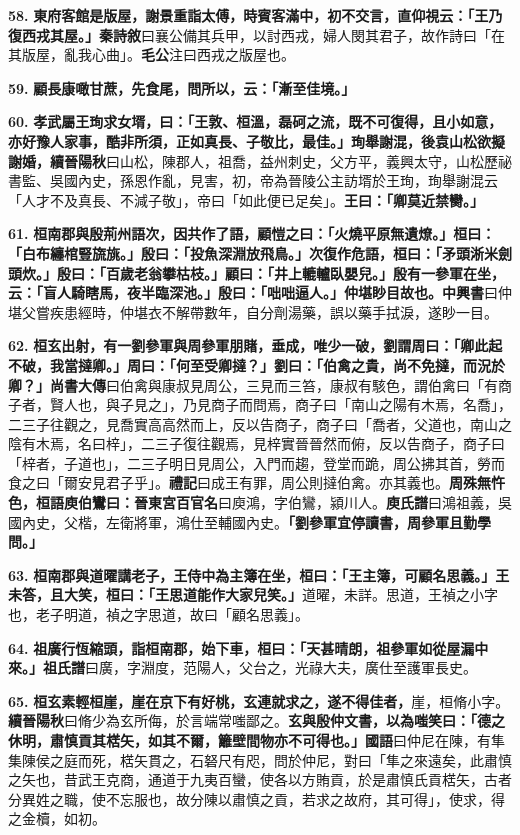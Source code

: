 \textbf{58.} \textbf{東府客館是版屋，謝景重詣太傅，時賓客滿中，初不交言，直仰視云：「王乃復西戎其屋。」}{\footnotesize \textbf{秦詩敘}曰襄公備其兵甲，以討西戎，婦人閔其君子，故作詩曰「在其版屋，亂我心曲」。\textbf{毛公}注曰西戎之版屋也。}

\textbf{59.} \textbf{顧長康噉甘蔗，先食尾，問所以，云：「漸至佳境。」}

\textbf{60.} \textbf{孝武屬王珣求女壻，曰：「王敦、桓溫，磊砢之流，既不可復得，且小如意，亦好豫人家事，酷非所須，正如真長、子敬比，最佳。」珣舉謝混，後袁山松欲擬謝婚，}{\footnotesize \textbf{續晉陽秋}曰山松，陳郡人，祖喬，益州刺史，父方平，義興太守，山松歷祕書監、吳國內史，孫恩作亂，見害，初，帝為晉陵公主訪壻於王珣，珣舉謝混云「人才不及真長、不減子敬」，帝曰「如此便已足矣」。}\textbf{王曰：「卿莫近禁臠。」}

\textbf{61.} \textbf{桓南郡與殷荊州語次，因共作了語，顧愷之曰：「火燒平原無遺燎。」桓曰：「白布纏棺豎旒旐。」殷曰：「投魚深淵放飛鳥。」次復作危語，桓曰：「矛頭淅米劍頭炊。」殷曰：「百歲老翁攀枯枝。」顧曰：「井上轆轤臥嬰兒。」殷有一參軍在坐，云：「盲人騎瞎馬，夜半臨深池。」殷曰：「咄咄逼人。」仲堪眇目故也。}{\footnotesize \textbf{中興書}曰仲堪父嘗疾患經時，仲堪衣不解帶數年，自分劑湯藥，誤以藥手拭淚，遂眇一目。}

\textbf{62.} \textbf{桓玄出射，有一劉參軍與周參軍朋賭，垂成，唯少一破，劉謂周曰：「卿此起不破，我當撻卿。」周曰：「何至受卿撻？」劉曰：「伯禽之貴，尚不免撻，而況於卿？」}{\footnotesize \textbf{尚書大傳}曰伯禽與康叔見周公，三見而三笞，康叔有駭色，謂伯禽曰「有商子者，賢人也，與子見之」，乃見商子而問焉，商子曰「南山之陽有木焉，名喬」，二三子往觀之，見喬實高高然而上，反以告商子，商子曰「喬者，父道也，南山之陰有木焉，名曰梓」，二三子復往觀焉，見梓實晉晉然而俯，反以告商子，商子曰「梓者，子道也」，二三子明日見周公，入門而趨，登堂而跪，周公拂其首，勞而食之曰「爾安見君子乎」。\textbf{禮記}曰成王有罪，周公則撻伯禽。亦其義也。}\textbf{周殊無忤色，桓語庾伯鸞曰：}{\footnotesize \textbf{晉東宮百官名}曰庾鴻，字伯鸞，潁川人。\textbf{庾氏譜}曰鴻祖義，吳國內史，父楷，左衛將軍，鴻仕至輔國內史。}\textbf{「劉參軍宜停讀書，周參軍且勤學問。」}

\textbf{63.} \textbf{桓南郡與道曜講老子，王侍中為主簿在坐，桓曰：「王主簿，可顧名思義。」王未答，且大笑，桓曰：「王思道能作大家兒笑。」}{\footnotesize 道曜，未詳。思道，王禎之小字也，老子明道，禎之字思道，故曰「顧名思義」。}

\textbf{64.} \textbf{祖廣行恆縮頭，詣桓南郡，始下車，桓曰：「天甚晴朗，祖參軍如從屋漏中來。」}{\footnotesize \textbf{祖氏譜}曰廣，字淵度，范陽人，父台之，光祿大夫，廣仕至護軍長史。}

\textbf{65.} \textbf{桓玄素輕桓崖，崖在京下有好桃，玄連就求之，遂不得佳者，}{\footnotesize 崖，桓脩小字。\textbf{續晉陽秋}曰脩少為玄所侮，於言端常嗤鄙之。}\textbf{玄與殷仲文書，以為嗤笑曰：「德之休明，肅慎貢其楛矢，如其不爾，籬壁間物亦不可得也。」}{\footnotesize \textbf{國語}曰仲尼在陳，有隼集陳侯之庭而死，楛矢貫之，石砮尺有咫，問於仲尼，對曰「隼之來遠矣，此肅慎之矢也，昔武王克商，通道于九夷百蠻，使各以方賄貢，於是肅慎氏貢楛矢，古者分異姓之職，使不忘服也，故分陳以肅慎之貢，若求之故府，其可得」，使求，得之金櫝，如初。}